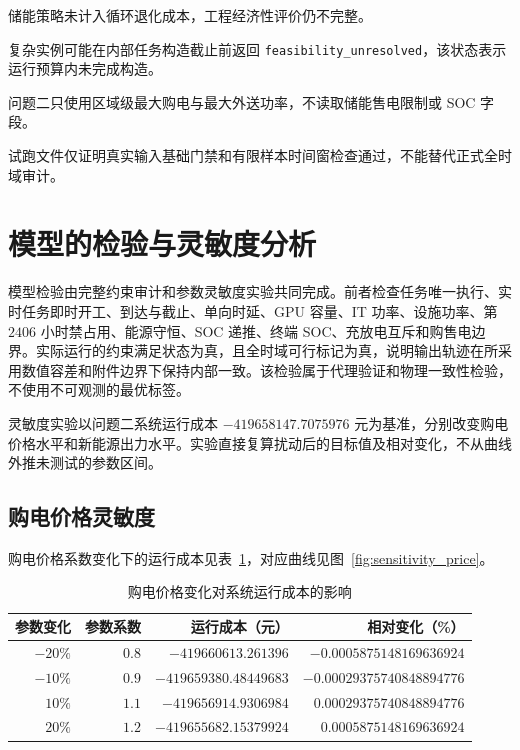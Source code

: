 \documentclass[withoutpreface,bwprint]{cumcmthesis}
\begin{document}
储能策略未计入循环退化成本，工程经济性评价仍不完整。

复杂实例可能在内部任务构造截止前返回 \texttt{feasibility\_unresolved}，该状态表示运行预算内未完成构造。

问题二只使用区域级最大购电与最大外送功率，不读取储能售电限制或 SOC 字段。

试跑文件仅证明真实输入基础门禁和有限样本时间窗检查通过，不能替代正式全时域审计。

\section{模型的检验与灵敏度分析}

模型检验由完整约束审计和参数灵敏度实验共同完成。前者检查任务唯一执行、实时任务即时开工、到达与截止、单向时延、GPU 容量、IT 功率、设施功率、第 $2406$ 小时禁占用、能源守恒、SOC 递推、终端 SOC、充放电互斥和购售电边界。实际运行的约束满足状态为真，且全时域可行标记为真，说明输出轨迹在所采用数值容差和附件边界下保持内部一致。该检验属于代理验证和物理一致性检验，不使用不可观测的最优标签。

灵敏度实验以问题二系统运行成本 $-419658147.7075976$ 元为基准，分别改变购电价格水平和新能源出力水平。实验直接复算扰动后的目标值及相对变化，不从曲线外推未测试的参数区间。

\subsection{购电价格灵敏度}

购电价格系数变化下的运行成本见表~\ref{tab:price_sensitivity}，对应曲线见图~\ref{fig:sensitivity_price}。

\begin{table}[htbp]
\centering
\caption{购电价格变化对系统运行成本的影响}
\label{tab:price_sensitivity}
\begin{tabular}{rrrr}
\toprule
参数变化 & 参数系数 & 运行成本（元） & 相对变化（\%）\\
\midrule
$-20\%$ & $0.8$ & $-419660613.261396$ & $-0.0005875148169636924$\\
$-10\%$ & $0.9$ & $-419659380.48449683$ & $-0.00029375740848894776$\\
$10\%$ & $1.1$ & $-419656914.9306984$ & $0.00029375740848894776$\\
$20\%$ & $1.2$ & $-419655682.15379924$ & $0.0005875148169636924$\\
\bottomrule
\end{tabular}
\end{table}
\end{document}
